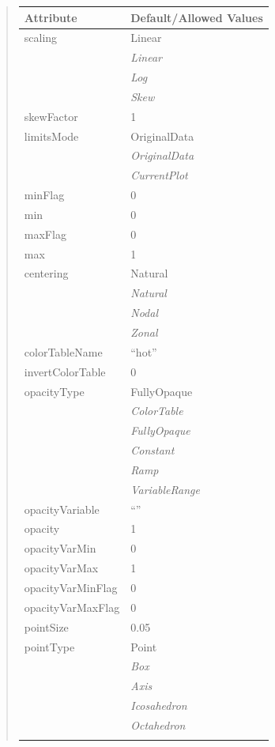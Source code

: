 \documentclass[letterpaper,10pt,english]{sphinxmanual}
\begin{document}
\begin{quote}
\begin{longtable}{|l|l|}
\textbf{Attribute}
 & 
\textbf{Default/Allowed Values}
\\
\hline
scaling
 & 
Linear
\\
\hline & 
\emph{Linear}
\\
\hline & 
\emph{Log}
\\
\hline & 
\emph{Skew}
\\
\hline
skewFactor
 & 
1
\\
\hline
limitsMode
 & 
OriginalData
\\
\hline & 
\emph{OriginalData}
\\
\hline & 
\emph{CurrentPlot}
\\
\hline
minFlag
 & 
0
\\
\hline
min
 & 
0
\\
\hline
maxFlag
 & 
0
\\
\hline
max
 & 
1
\\
\hline
centering
 & 
Natural
\\
\hline & 
\emph{Natural}
\\
\hline & 
\emph{Nodal}
\\
\hline & 
\emph{Zonal}
\\
\hline
colorTableName
 & 
``hot''
\\
\hline
invertColorTable
 & 
0
\\
\hline
opacityType
 & 
FullyOpaque
\\
\hline & 
\emph{ColorTable}
\\
\hline & 
\emph{FullyOpaque}
\\
\hline & 
\emph{Constant}
\\
\hline & 
\emph{Ramp}
\\
\hline & 
\emph{VariableRange}
\\
\hline
opacityVariable
 & 
``''
\\
\hline
opacity
 & 
1
\\
\hline
opacityVarMin
 & 
0
\\
\hline
opacityVarMax
 & 
1
\\
\hline
opacityVarMinFlag
 & 
0
\\
\hline
opacityVarMaxFlag
 & 
0
\\
\hline
pointSize
 & 
0.05
\\
\hline
pointType
 & 
Point
\\
\hline & 
\emph{Box}
\\
\hline & 
\emph{Axis}
\\
\hline & 
\emph{Icosahedron}
\\
\hline & 
\emph{Octahedron}
\\
\hline & 

\end{longtable}
\end{quote}
\end{document}
